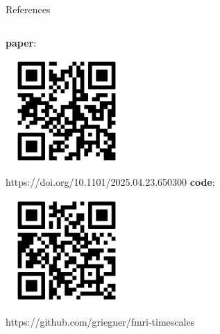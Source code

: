 \documentclass[8pt,aspectratio=169]{beamer}
\begin{document}
\begin{frame}{References}


\vspace{5mm}
\vspace{1cm}

\begin{columns}
\centering
\textbf{paper}:\\
\includegraphics[width=0.35\textwidth]{docs/wnar/paper.png}\\
https://doi.org/10.1101/2025.04.23.650300
\centering
\textbf{code}:\\
\includegraphics[width=0.35\textwidth]{docs/wnar/code.png}\\
https://github.com/griegner/fmri-timescales
\end{columns}
\end{frame}
\end{document}
